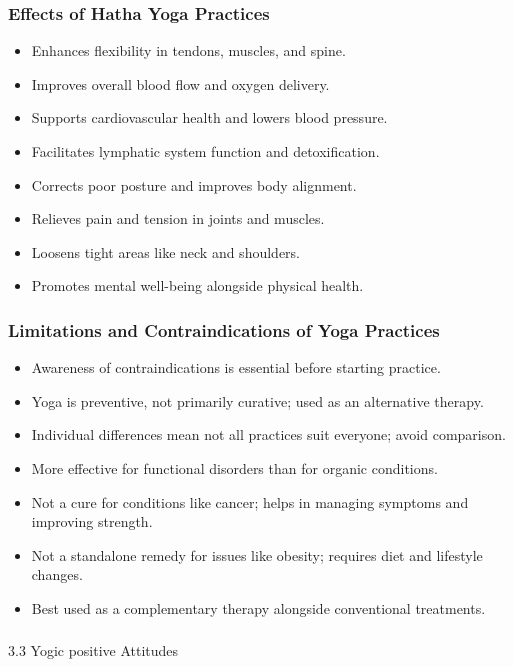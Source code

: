 \begin{frame}[fragile]\frametitle{Effects of Hatha Yoga Practices}
      \begin{itemize}
        \item Enhances flexibility in tendons, muscles, and spine.
        \item Improves overall blood flow and oxygen delivery.
        \item Supports cardiovascular health and lowers blood pressure.
        \item Facilitates lymphatic system function and detoxification.
        \item Corrects poor posture and improves body alignment.
        \item Relieves pain and tension in joints and muscles.
        \item Loosens tight areas like neck and shoulders.
        \item Promotes mental well-being alongside physical health.
      \end{itemize}
\end{frame}

\begin{frame}[fragile]\frametitle{Limitations and Contraindications of Yoga Practices}
      \begin{itemize}
        \item Awareness of contraindications is essential before starting practice.
        \item Yoga is preventive, not primarily curative; used as an alternative therapy.
        \item Individual differences mean not all practices suit everyone; avoid comparison.
        \item More effective for functional disorders than for organic conditions.
        \item Not a cure for conditions like cancer; helps in managing symptoms and improving strength.
        \item Not a standalone remedy for issues like obesity; requires diet and lifestyle changes.
        \item Best used as a complementary therapy alongside conventional treatments.
      \end{itemize}
\end{frame}


\begin{frame}[fragile]\frametitle{}
\begin{center}
{\Large 3.3 Yogic positive Attitudes}
\end{center}
\end{frame}

